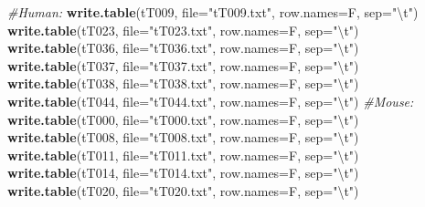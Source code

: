 \documentclass[
]{article}
\newenvironment{Shaded}{\begin{snugshade}}{\end{snugshade}}
\newcommand{\CharTok}[1]{\textcolor[rgb]{0.31,0.60,0.02}{#1}}
\newcommand{\CommentTok}[1]{\textcolor[rgb]{0.56,0.35,0.01}{\textit{#1}}}
\newcommand{\DataTypeTok}[1]{\textcolor[rgb]{0.13,0.29,0.53}{#1}}
\newcommand{\KeywordTok}[1]{\textcolor[rgb]{0.13,0.29,0.53}{\textbf{#1}}}
\newcommand{\NormalTok}[1]{#1}
\newcommand{\StringTok}[1]{\textcolor[rgb]{0.31,0.60,0.02}{#1}}
\begin{document}
\begin{Shaded}
\begin{Highlighting}[]
\CommentTok{#Human:}
\KeywordTok{write.table}\NormalTok{(tT009, }\DataTypeTok{file=}\StringTok{"tT009.txt"}\NormalTok{, }\DataTypeTok{row.names=}\NormalTok{F, }\DataTypeTok{sep=}\StringTok{"}\CharTok{\textbackslash{}t}\StringTok{"}\NormalTok{)}
\KeywordTok{write.table}\NormalTok{(tT023, }\DataTypeTok{file=}\StringTok{"tT023.txt"}\NormalTok{, }\DataTypeTok{row.names=}\NormalTok{F, }\DataTypeTok{sep=}\StringTok{"}\CharTok{\textbackslash{}t}\StringTok{"}\NormalTok{)}
\KeywordTok{write.table}\NormalTok{(tT036, }\DataTypeTok{file=}\StringTok{"tT036.txt"}\NormalTok{, }\DataTypeTok{row.names=}\NormalTok{F, }\DataTypeTok{sep=}\StringTok{"}\CharTok{\textbackslash{}t}\StringTok{"}\NormalTok{)}
\KeywordTok{write.table}\NormalTok{(tT037, }\DataTypeTok{file=}\StringTok{"tT037.txt"}\NormalTok{, }\DataTypeTok{row.names=}\NormalTok{F, }\DataTypeTok{sep=}\StringTok{"}\CharTok{\textbackslash{}t}\StringTok{"}\NormalTok{)}
\KeywordTok{write.table}\NormalTok{(tT038, }\DataTypeTok{file=}\StringTok{"tT038.txt"}\NormalTok{, }\DataTypeTok{row.names=}\NormalTok{F, }\DataTypeTok{sep=}\StringTok{"}\CharTok{\textbackslash{}t}\StringTok{"}\NormalTok{)}
\KeywordTok{write.table}\NormalTok{(tT044, }\DataTypeTok{file=}\StringTok{"tT044.txt"}\NormalTok{, }\DataTypeTok{row.names=}\NormalTok{F, }\DataTypeTok{sep=}\StringTok{"}\CharTok{\textbackslash{}t}\StringTok{"}\NormalTok{)}
\CommentTok{#Mouse:}
\KeywordTok{write.table}\NormalTok{(tT000, }\DataTypeTok{file=}\StringTok{"tT000.txt"}\NormalTok{, }\DataTypeTok{row.names=}\NormalTok{F, }\DataTypeTok{sep=}\StringTok{"}\CharTok{\textbackslash{}t}\StringTok{"}\NormalTok{)}
\KeywordTok{write.table}\NormalTok{(tT008, }\DataTypeTok{file=}\StringTok{"tT008.txt"}\NormalTok{, }\DataTypeTok{row.names=}\NormalTok{F, }\DataTypeTok{sep=}\StringTok{"}\CharTok{\textbackslash{}t}\StringTok{"}\NormalTok{)}
\KeywordTok{write.table}\NormalTok{(tT011, }\DataTypeTok{file=}\StringTok{"tT011.txt"}\NormalTok{, }\DataTypeTok{row.names=}\NormalTok{F, }\DataTypeTok{sep=}\StringTok{"}\CharTok{\textbackslash{}t}\StringTok{"}\NormalTok{)}
\KeywordTok{write.table}\NormalTok{(tT014, }\DataTypeTok{file=}\StringTok{"tT014.txt"}\NormalTok{, }\DataTypeTok{row.names=}\NormalTok{F, }\DataTypeTok{sep=}\StringTok{"}\CharTok{\textbackslash{}t}\StringTok{"}\NormalTok{)}
\KeywordTok{write.table}\NormalTok{(tT020, }\DataTypeTok{file=}\StringTok{"tT020.txt"}\NormalTok{, }\DataTypeTok{row.names=}\NormalTok{F, }\DataTypeTok{sep=}\StringTok{"}\CharTok{\textbackslash{}t}\StringTok{"}\NormalTok{)}

\end{Highlighting}
\end{Shaded}
\end{document}
